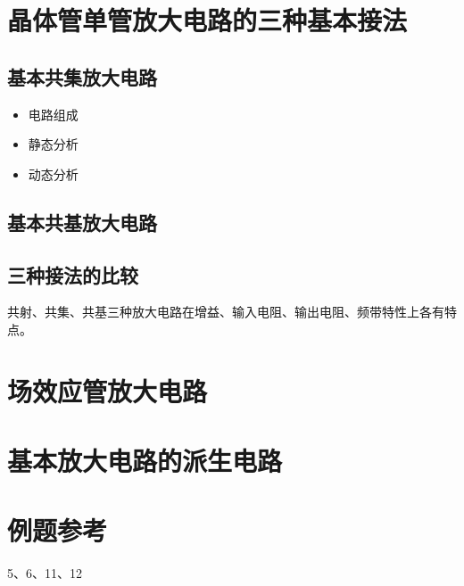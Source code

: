 \section{晶体管单管放大电路的三种基本接法}
\subsection{基本共集放大电路}
\begin{itemize}
    \item 电路组成
    \item 静态分析
    \item 动态分析
\end{itemize}

\subsection{基本共基放大电路}
\subsection{三种接法的比较}
共射、共集、共基三种放大电路在增益、输入电阻、输出电阻、频带特性上各有特点。

\section{场效应管放大电路}
\section{基本放大电路的派生电路}

\section{例题参考}
5、6、11、12